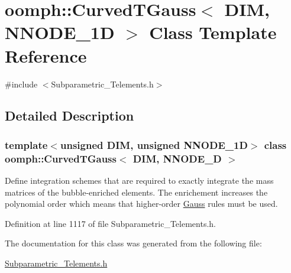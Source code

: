 \hypertarget{classoomph_1_1CurvedTGauss}{}\section{oomph\+:\+:Curved\+T\+Gauss$<$ D\+IM, N\+N\+O\+D\+E\+\_\+1D $>$ Class Template Reference}
\label{classoomph_1_1CurvedTGauss}


{\ttfamily \#include $<$Subparametric\+\_\+\+Telements.\+h$>$}



\subsection{Detailed Description}
\subsubsection*{template$<$unsigned D\+IM, unsigned N\+N\+O\+D\+E\+\_\+1D$>$\newline
class oomph\+::\+Curved\+T\+Gauss$<$ D\+I\+M, N\+N\+O\+D\+E\+\_\+D $>$}

Define integration schemes that are required to exactly integrate the mass matrices of the bubble-\/enriched elements. The enrichement increases the polynomial order which means that higher-\/order \hyperlink{classoomph_1_1Gauss}{Gauss} rules must be used. 

Definition at line 1117 of file Subparametric\+\_\+\+Telements.\+h.



The documentation for this class was generated from the following file\+:\begin{DoxyCompactItemize}
\item 
\hyperlink{Subparametric__Telements_8h}{Subparametric\+\_\+\+Telements.\+h}\end{DoxyCompactItemize}

